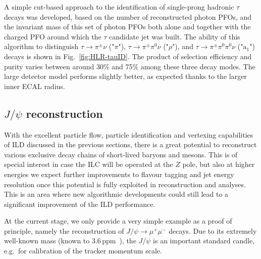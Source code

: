 A simple cut-based approach to the identification of single-prong hadronic $\tau$ decays was developed, based on the number of reconstructed photon PFOs, and the invariant mass of this set of photon PFOs both alone and together with the charged PFO around which the $\tau$ candidate jet was built.
The ability of this algorithm to distinguish $\tau \rightarrow \pi^\pm \nu$ ("$\pi$"), $\tau \rightarrow \pi^\pm \pi^0 \nu$ ("$\rho$"), and $\tau \rightarrow \pi^\pm \pi^0 \pi^0 \nu$ ("$\mathrm{a_1}$") decays is shown in Fig.~\ref{fig:HLR-tauID}. 
The product of selection efficiency and purity varies between around 30\% and 75\% among these three decay modes.
The large detector model performs slightly better, as expected thanks to the larger inner ECAL radius.

\subsection[J/Psi reconstruction]{$J/\psi$ reconstruction}
With the excellent particle flow, particle identification and vertexing capabilities
of ILD discussed in the previous sections, there is a great potential to reconstruct
various exclusive decay chains of short-lived baryons and mesons. This is of special
interest in case the ILC will be operated at the $Z$ pole, but also at higher energies we expect further improvements to flavour tagging and jet energy resolution
once this potential is fully exploited in reconstruction and analyses. This is an area where new algorithmic developments could still lead to a significant improvement
of the ILD performance.

At the current stage, we only provide a very simple example as a proof of principle, namely the reconstruction of $J/\psi \to \mu^+\mu^-$ decays. Due to its extremely well-known mass (known to 3.6\,ppm~\cite{Tanabashi:2018oca}), the $J/\psi$ is an important standard candle, e.g.\ for calibration of the tracker momentum scale.

